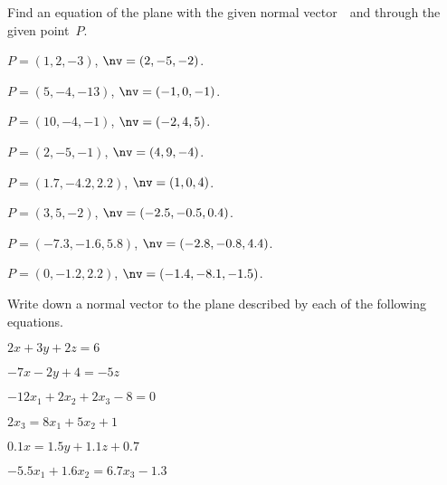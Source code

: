 \begin{exercise} \label{ex:} 
Find an equation of the plane with the given normal vector~\nv\ and through the given point~\(P\).
\begin{parts}
\item \(P=(1,2,-3)\), \(\nv=(2,-5,-2)\).
\item \(P=(5,-4,-13)\), \(\nv=(-1,0,-1)\).
\item \(P=(10,-4,-1)\), \(\nv=(-2,4,5)\).
\item \(P=(2,-5,-1)\), \(\nv=(4,9,-4)\).
\item \(P=(1.7,-4.2,2.2)\), \(\nv=( 1,0,4)\).
\item \(P=(3,5,-2)\), \(\nv=(-2.5,-0.5,0.4)\).
\item \(P=(-7.3,-1.6,5.8)\), \(\nv=(-2.8,-0.8,4.4)\).
\item \(P=(0,-1.2,2.2)\), \(\nv=(-1.4,-8.1,-1.5)\).
\end{parts}
\end{exercise}




\begin{exercise} \label{ex:} 
Write down a normal vector to the plane described by each of the following equations.
\begin{parts}
\item \(2x+3y+2z=6\)
\item \(-7x-2y+4=-5z\)
\item \(-12x_1+2x_2+2x_3-8=0\)
\item \(2x_3=8x_1+5x_2+1\)
\item \(0.1x=1.5y+1.1z+0.7\)
\item \(-5.5x_1+1.6x_2=6.7x_3-1.3\)
\end{parts}
\end{exercise}


